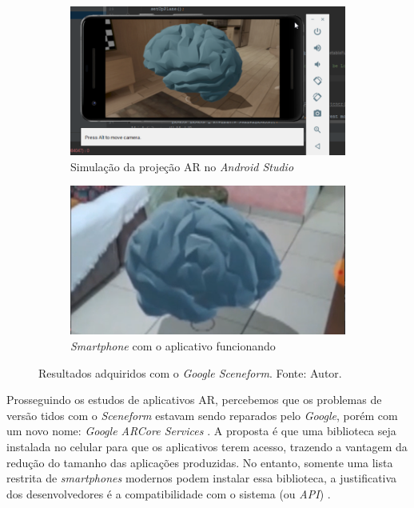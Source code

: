 \begin{figure}[ht]
\centering
    \begin{subfigure}{.45\textwidth}
        \centering
        \includegraphics[width=.95\textwidth]{figuras/sceneform.png}
        \caption{Simulação da projeção AR no \textit{Android Studio}}
        \label{fig:sceneform-sim}
    \end{subfigure}
    \begin{subfigure}{.45\textwidth}
        \centering
        \includegraphics[width=.95\textwidth]{figuras/sceneformAR.png}
        \caption{\textit{Smartphone} com o aplicativo funcionando}
        \label{fig:sceneform-real}
    \end{subfigure}
    \caption{Resultados adquiridos com o \textit{Google Sceneform}. Fonte: Autor.}
    \label{fig:sceneform-tests}
\end{figure}

Prosseguindo os estudos de aplicativos AR, percebemos que os problemas de versão tidos com o \textit{Sceneform} estavam sendo reparados pelo \textit{Google}, porém com um novo nome: \textit{Google ARCore Services} \cite{arcore-googleplay}. A proposta é que uma biblioteca seja instalada no celular para que os aplicativos terem acesso, trazendo a vantagem da redução do tamanho das aplicações produzidas. No entanto, somente uma lista restrita de \textit{smartphones} modernos podem instalar essa biblioteca, a justificativa dos desenvolvedores é a compatibilidade com o sistema (ou \textit{API}) \cite{arcore-list}.

